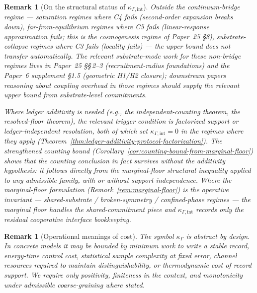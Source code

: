 \documentclass[11pt]{article}
\newtheorem{remark}[theorem]{Remark}
\begin{document}
\begin{remark}[On the structural status of $\kappa_{\Gamma,\mathrm{int}}$]
Outside the continuum-bridge regime --- saturation regimes where C4 fails (second-order expansion breaks down), far-from-equilibrium regimes where C5 fails (linear-response approximation fails; this is the cosmogenesis regime of Paper~25 \S8), substrate-collapse regimes where C3 fails (locality fails) --- the upper bound does not transfer automatically.  The relevant substrate-mode work for these non-bridge regimes lives in Paper~25 \S\S\,2--3 (recruitment-radius foundations) and the Paper~6 supplement \S1.5 (geometric H1/H2 closure); downstream papers reasoning about coupling overhead in those regimes should supply the relevant upper bound from substrate-level commitments.

Where ledger additivity is needed (e.g., the independent-counting theorem, the resolved-floor theorem), the relevant trigger condition is factorized support or ledger-independent resolution, both of which set $\kappa_{\Gamma,\mathrm{int}} = 0$ in the regimes where they apply (Theorem~\ref{thm:ledger-additivity-protocol-factorization}).  The strengthened counting bound (Corollary~\ref{cor:counting-bound-from-marginal-floor}) shows that the counting conclusion in fact survives without the additivity hypothesis: it follows directly from the marginal-floor structural inequality applied to any admissible family, with or without support-independence.  Where the marginal-floor formulation (Remark~\ref{rem:marginal-floor}) is the operative invariant --- shared-substrate / broken-symmetry / confined-phase regimes --- the marginal floor handles the shared-commitment piece and $\kappa_{\Gamma,\mathrm{int}}$ records only the residual cooperative interface bookkeeping.
\end{remark}

\begin{remark}[Operational meanings of cost]
The symbol $\kappa_\Gamma$ is abstract by design.  In concrete models it may be bounded by minimum work to write a stable record, energy-time control cost, statistical sample complexity at fixed error, channel resources required to maintain distinguishability, or thermodynamic cost of record support.  We require only positivity, finiteness in the context, and monotonicity under admissible coarse-graining where stated.
\end{remark}
\end{document}
